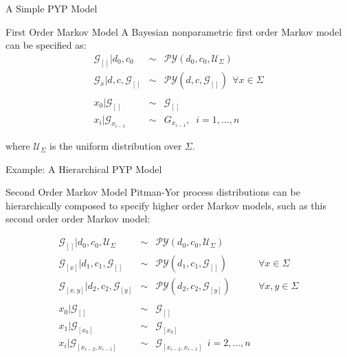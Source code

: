 \documentclass{beamer}
\newcommand{\G}{\mathcal{G}}
\newcommand{\PY}{\mathcal{P}\mathcal{Y}}
\begin{document}
	\begin{frame}[t]{A Simple PYP Model  \cite{Pitman1997}}
	
	\begin{block}{First Order Markov Model}
	A Bayesian nonparametric first order Markov model can be specified as:
	\begin{eqnarray*}
		\G_{[]} | d_0, c_0 &\sim& \PY(d_0, c_0, \mathcal{U}_\Sigma)\\
		\G_x | d,c, \G_{[]} &\sim& \PY(d,c,\G_{[]}) \ \ \forall x \in \Sigma \\
		\\
		x_0 | \G_{[]} &\sim& \G_{[]} \\
		x_i | \G_{x_{i-1}} &\sim& G_{x_{i-1}}, \;\; i=1,\ldots,n
	\end{eqnarray*}
	
	where $\mathcal{U}_\Sigma$ is the uniform distribution over $\Sigma$.	
	\end{block}
\end{frame}

\begin{frame}[t]{Example: A Hierarchical PYP Model \cite{teh2006a}}

\begin{block}{Second Order Markov Model}
	Pitman-Yor process distributions can be hierarchically composed to specify higher order Markov models, such as this second order order Markov model:

	\[
	\begin{array}{rcll}
		\G_{[]} | d_0,c_0,\mathcal{U}_\Sigma &\sim& \PY(d_0, c_0, \mathcal{U}_\Sigma)\\
		\G_{[x]} | d_1, c_1, \G_{[]} &\sim& \PY(d_1, c_1, \G_{[]}) & \forall x \in \Sigma \\
		\G_{[x,y]} | d_2, c_2, \G_{[y]} &\sim& \PY(d_2, c_2, \G_{[y]} )& \forall x, y \in \Sigma\\
		\\
		x_0 | \G_{[]} &\sim& \G_{[]} \\
		x_1 | \G_{[x_0]} &\sim& \G_{[x_0]} \\
		x_i | \G_{[x_{i-2}, x_{i-1}]} &\sim& \G_{[x_{i-2}, x_{i-1}]} \ \ i = 2, \ldots, n 
	\end{array}
	\]
	\end{block}
	
\end{frame}
\end{document}

